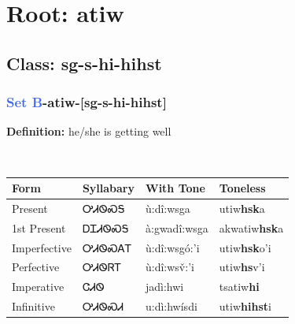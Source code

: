 \needspace{4in}
\section*{Root: atiw}
\nopagebreak
{}
\needspace{3in}
\subsection*{Class: sg-s-hi-hihst}
\nopagebreak
\needspace{2in}
\subsubsection*{\textcolor{RoyalBlue}{Set B}{-}\textbf{atiw}{-}[sg-s-hi-hihst]}
\nopagebreak
\textbf{Definition: } he/she is getting well
\\[0.5em]
\begin{tabularx}{\textwidth}{l X X X}%
\toprule%
\textbf{Form}&\textbf{Syllabary}&\textbf{With Tone}&\textbf{Toneless}\\%
\midrule%
Present&ᎤᏗᏫᏍᎦ&ù:dî:wsga&utiw\textbf{hsk}a\\%
1st Present&ᎠᏆᏗᏫᏍᎦ&à:gwadî:wsga&akwatiw\textbf{hsk}a\\%
Imperfective&ᎤᏗᏫᏍᎪᎢ&ù:dî:wsgó:’i&utiw\textbf{hsk}o'i\\%
Perfective&ᎤᏗᏫᏒᎢ&ù:dî:wsv̌:’i&utiw\textbf{hs}v'i\\%
Imperative&ᏣᏗᏫ&jadì:hwi&tsatiw\textbf{hi}\\%
Infinitive&ᎤᏗᏫᏍᏗ&u:dì:hwísdi&utiw\textbf{hihst}i\\%
\bottomrule%
\end{tabularx}
\\[1em]